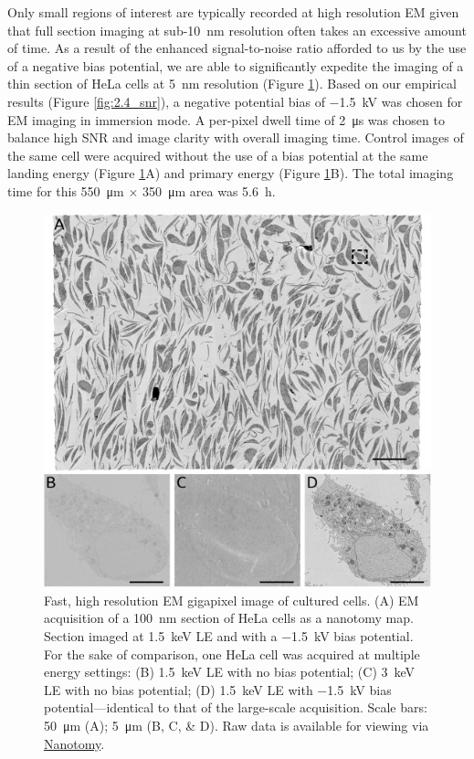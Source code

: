 Only small regions of interest are typically recorded at high resolution EM given that full section imaging at sub-\SI{10}{\nano\meter} resolution often takes an excessive amount of time. As a result of the enhanced signal-to-noise ratio afforded to us by the use of a negative bias potential, we are able to significantly expedite the imaging of a thin section of HeLa cells at \SI{5}{\nano\meter} resolution (Figure \ref{fig:2.6_cells}). Based on our empirical results (Figure \ref{fig:2.4_snr}), a negative potential bias of \SI{-1.5}{\kilo\volt} was chosen for EM imaging in immersion mode. A per-pixel dwell time of \SI{2}{\micro\second} was chosen to balance high SNR and image clarity with overall imaging time. Control images of the same cell were acquired without the use of a bias potential at the same landing energy (Figure \ref{fig:2.6_cells}A) and primary energy (Figure \ref{fig:2.6_cells}B). The total imaging time for this \SI{550}{\micro\meter} $\times$ \SI{350}{\micro\meter} area was \SI{5.6}{\hour}.

\begin{figure}[!tb]
    \centering
    \includegraphics[width=\linewidth]{chapter-2/figures_JPEG_LQ/fig2-6_cells.jpg}
    \caption{Fast, high resolution EM gigapixel image of cultured cells. (A) EM acquisition of a \SI{100}{\nano\meter} section of HeLa cells as a nanotomy map. Section imaged at \SI{1.5}{\kilo\electronvolt} LE and with a \SI{-1.5}{\kilo\volt} bias potential. For the sake of comparison, one HeLa cell was acquired at multiple energy settings: (B) \SI{1.5}{\kilo\electronvolt} LE with no bias potential; (C) \SI{3}{\kilo\electronvolt} LE with no bias potential; (D) \SI{1.5}{\kilo\electronvolt} LE with \SI{-1.5}{\kilo\volt} bias potential—identical to that of the large-scale acquisition. Scale bars: \SI{50}{\micro\meter} (A); \SI{5}{\micro\meter} (B, C, \& D). Raw data is available for viewing via \href{www.nanotomy.org}{Nanotomy}.}
    \label{fig:2.6_cells}
\end{figure}

